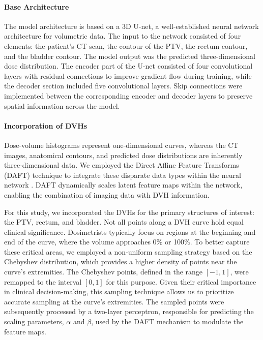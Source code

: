 \paragraph{Base Architecture}
The model architecture is based on a 3D U-net, a well-established neural network architecture for volumetric data.
The input to the network consisted of four elements: the patient's CT scan, the contour of the PTV, the rectum contour, and the bladder contour.
The model output was the predicted three-dimensional dose distribution.
The encoder part of the U-net consisted of four convolutional layers with residual connections to improve gradient flow during training, while the decoder section included five convolutional layers.
Skip connections were implemented between the corresponding encoder and decoder layers to preserve spatial information across the model.

\paragraph{Incorporation of DVHs}
Dose-volume histograms represent one-dimensional curves, whereas the CT images, anatomical contours, and predicted dose distributions are inherently three-dimensional data.
We employed the Direct Affine Feature Transforms (DAFT) technique to integrate these disparate data types within the neural network \cite{Polsterl2021}.
DAFT dynamically scales latent feature maps within the network, enabling the combination of imaging data with DVH information.

For this study, we incorporated the DVHs for the primary structures of interest: the PTV, rectum, and bladder.
Not all points along a DVH curve hold equal clinical significance.
Dosimetrists typically focus on regions at the beginning and end of the curve, where the volume approaches 0\% or 100\%.
To better capture these critical areas, we employed a non-uniform sampling strategy based on the Chebyshev distribution, which provides a higher density of points near the curve's extremities.
The Chebyshev points, defined in the range $\left[ -1, 1 \right]$, were remapped to the interval $\left[ 0, 1 \right]$ for this purpose.
Given their critical importance in clinical decision-making, this sampling technique allows us to prioritize accurate sampling at the curve's extremities.
The sampled points were subsequently processed by a two-layer perceptron, responsible for predicting the scaling parameters, $\alpha$ and $\beta$, used by the DAFT mechanism to modulate the feature maps.

